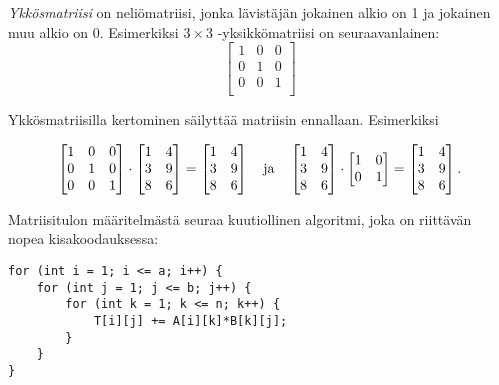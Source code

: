 \textit{Ykkösmatriisi} on neliömatriisi,
jonka lävistäjän jokainen alkio on 1
ja jokainen muu alkio on 0.
Esimerkiksi $3 \times 3$ -yksikkömatriisi on
seuraavanlainen:
\[
 \begin{bmatrix}
  1 & 0 & 0 \\
  0 & 1 & 0 \\
  0 & 0 & 1 \\
 \end{bmatrix}
\]

Ykkösmatriisilla kertominen säilyttää matriisin
ennallaan. Esimerkiksi

\[
 \begin{bmatrix}
  1 & 0 & 0 \\
  0 & 1 & 0 \\
  0 & 0 & 1 \\
 \end{bmatrix}
\cdot
 \begin{bmatrix}
  1 & 4 \\
  3 & 9 \\
  8 & 6 \\
 \end{bmatrix}
=
 \begin{bmatrix}
  1 & 4 \\
  3 & 9 \\
  8 & 6 \\
 \end{bmatrix} \hspace{10px} \textrm{ja} \hspace{10px}
 \begin{bmatrix}
  1 & 4 \\
  3 & 9 \\
  8 & 6 \\
 \end{bmatrix}
\cdot
 \begin{bmatrix}
  1 & 0 \\
  0 & 1 \\
 \end{bmatrix}
=
 \begin{bmatrix}
  1 & 4 \\
  3 & 9 \\
  8 & 6 \\
 \end{bmatrix}.
\]

Matriisitulon määritelmästä seuraa kuutiollinen
algoritmi, joka on riittävän nopea kisakoodauksessa:

\begin{lstlisting}
for (int i = 1; i <= a; i++) {
    for (int j = 1; j <= b; j++) {
        for (int k = 1; k <= n; k++) {
            T[i][j] += A[i][k]*B[k][j];
        }
    }
}
\end{lstlisting}

